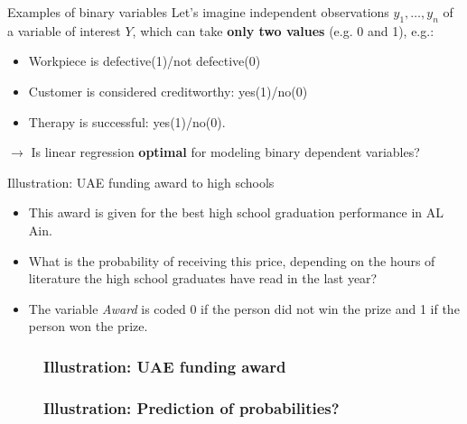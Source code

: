 \documentclass{beamer}
\begin{document}
\begin{frame}{Examples of binary variables}
	\vspace{-7mm}
Let's imagine independent observations $y_1,\ldots,y_n$ of a
	variable of interest $Y$, which can take \textbf{only two values} (e.g. 0 and 1), e.g.:
	\vspace{3mm}
	\begin{itemize}
		\item Workpiece is defective(1)/not defective(0)
		\vspace{3mm}
		\item Customer is considered creditworthy: yes(1)/no(0)
		\vspace{3mm}
		\item Therapy is successful: yes(1)/no(0).
	\end{itemize}
	\vspace{3mm}
	$\rightarrow$ Is linear regression \textbf{optimal} for modeling binary dependent variables?
\end{frame}


\begin{frame}{Illustration: UAE funding award to high schools }
	\vspace{-3mm}
	\begin{itemize}
		\item  This award is given for the best high school graduation performance in AL Ain.
		\vspace{3mm}
		\item
		What is the probability of receiving this price, depending on the hours of literature the high school graduates have read in the last year?
		\vspace{3mm}
		\item
		The variable \textit{Award} is coded 0 if the person did not win the prize and 1 if the person won the prize.
	\end{itemize}
\end{frame}

\begin{frame}
	\begin{figure}	
		\frametitle{Illustration: UAE funding award}
		\centering
		\hspace*{-0.8cm}
	\end{figure}
\end{frame}


\begin{frame}
	\begin{figure}	
		\frametitle{Illustration: Prediction of probabilities?}
		\centering
		\hspace*{-0.8cm}
	\end{figure}
\end{frame}
\end{document}
